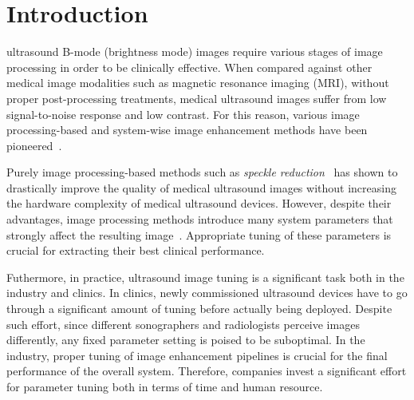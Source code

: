 
\section{Introduction}\label{section:introduction}
 ultrasound B-mode (brightness mode) images require various stages of image processing in order to be clinically effective.
When compared against other medical image modalities such as magnetic resonance imaging (MRI), without proper post-processing treatments, medical ultrasound images suffer from low signal-to-noise response and low contrast.
For this reason, various image processing-based and system-wise image enhancement methods have been pioneered~\cite{contrerasortiz_ultrasound_2012}.

Purely image processing-based methods such as \textit{speckle reduction}~\cite{finn_echocardiographic_2011, duarte-salazar_speckle_2020} has shown to drastically improve the quality of medical ultrasound images without increasing the hardware complexity of medical ultrasound devices. 
However, despite their advantages, image processing methods introduce many system parameters that strongly affect the resulting image~\cite{duarte-salazar_speckle_2020}.
Appropriate tuning of these parameters is crucial for extracting their best clinical performance.%

Futhermore, in practice, ultrasound image tuning is a significant task both in the industry and clinics.
In clinics, newly commissioned ultrasound devices have to go through a significant amount of tuning before actually being deployed.
Despite such effort, since different sonographers and radiologists perceive images differently, any fixed parameter setting is poised to be suboptimal.
In the industry, proper tuning of image enhancement pipelines is crucial for the final performance of the overall system.
Therefore, companies invest a significant effort for parameter tuning both in terms of time and human resource.


